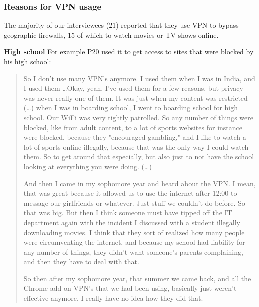 \subsubsection{Reasons for VPN usage}
The majority of our interviewees (21) reported that they use VPN to bypass geographic firewalls, 15 of which to watch movies or TV shows online.  

\textbf{High school} For example P20 used it to get access to sites that were blocked by his high school: 
\begin{quote}So I don't use many VPN's anymore. I used them when I was in India, and I used them \dots Okay, yeah. I've used them for a few reasons, but privacy was never really one of them. It was just when my content was restricted (\dots) when I was in boarding school, I went to boarding school for high school. Our WiFi was very tightly patrolled. So any number of things were blocked, like from adult content, to a lot of sports websites for instance were blocked, because they "encouraged gambling," and I like to watch a lot of sports online illegally, because that was the only way I could watch them. So to get around that especially, but also just to not have the school looking at everything you were doing. (\dots) 

And then I came in my sophomore year and heard about the VPN. I mean, that was great because it allowed us to use the internet after 12:00 to message our girlfriends or whatever. Just stuff we couldn't do before. So that was big. But then I think someone must have tipped off the IT department again with the incident I discussed with a student illegally downloading movies. I think that they sort of realized how many people were circumventing the internet, and because my school had liability for any number of things, they didn't want someone's parents complaining, and then they have to deal with that.


So then after my sophomore year, that summer we came back, and all the Chrome add on VPN's that we had been using, basically just weren't effective anymore. I really have no idea how they did that.\end{quote}


